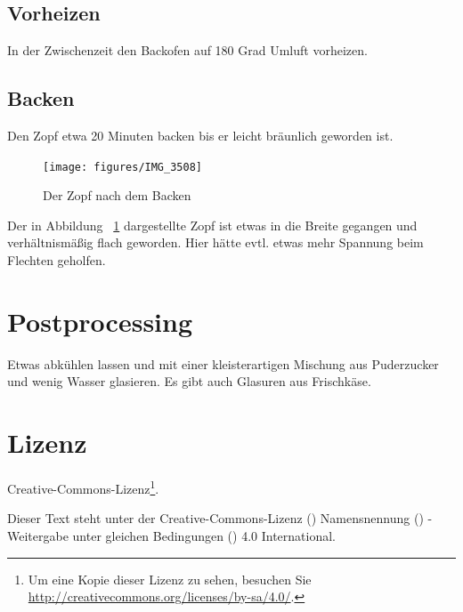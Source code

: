 \documentclass[a4paper, oneside]{recipe}
\begin{document}
\subsection*{Vorheizen}
In der Zwischenzeit den Backofen auf 180 Grad Umluft vorheizen.

\subsection*{Backen}
Den Zopf etwa 20 Minuten backen bis er leicht bräunlich geworden ist.

\begin{figure}[!ht]
  \centering
  \texttt{[image: figures/IMG\_3508]}
  \caption{Der Zopf nach dem Backen}
  \label{fig:zopf_fertig}
\end{figure}

Der in Abbildung ~\ref{fig:zopf_fertig} dargestellte Zopf ist etwas in die Breite gegangen und verhältnismäßig flach geworden. Hier hätte evtl. etwas mehr Spannung beim Flechten geholfen.

\section*{Postprocessing}
Etwas abkühlen lassen und mit einer kleisterartigen Mischung aus Puderzucker und wenig Wasser glasieren. Es gibt auch Glasuren aus Frischkäse.

\section*{Lizenz}
\ccbysa{} Creative-Commons-Lizenz\footnote{Um eine Kopie dieser Lizenz zu sehen, besuchen Sie \url{http://creativecommons.org/licenses/by-sa/4.0/}.}.

Dieser Text steht unter der Creative-Commons-Lizenz (\ccLogo) Namensnennung (\ccAttribution) - Weitergabe unter gleichen Bedingungen (\ccShareAlike) 4.0 International. 
\end{document}
